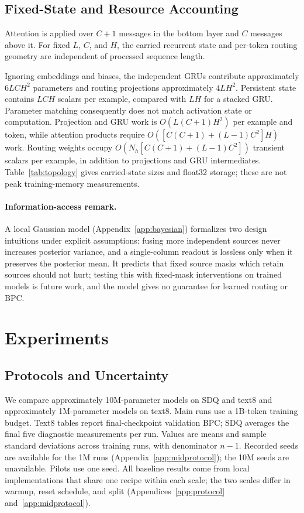 \documentclass[letterpaper,twoside]{article}
\begin{document}
\subsection{Fixed-State and Resource Accounting}

Attention is applied over $C+1$ messages in the bottom layer and $C$ messages above it. For fixed $L$, $C$, and $H$, the carried recurrent state and per-token routing geometry are independent of processed sequence length.

Ignoring embeddings and biases, the independent GRUs contribute approximately $6LCH^2$ parameters and routing projections approximately $4LH^2$. Persistent state contains $LCH$ scalars per example, compared with $LH$ for a stacked GRU. Parameter matching consequently does not match activation state or computation. Projection and GRU work is $O(L(C+1)H^2)$ per example and token, while attention products require $O([C(C+1)+(L-1)C^2]H)$ work. Routing weights occupy $O(N_h[C(C+1)+(L-1)C^2])$ transient scalars per example, in addition to projections and GRU intermediates. Table~\ref{tab:topology} gives carried-state sizes and float32 storage; these are not peak training-memory measurements.

\paragraph{Information-access remark.}
A local Gaussian model (Appendix~\ref{app:bayesian}) formalizes two design intuitions under explicit assumptions: fusing more independent sources never increases posterior variance, and a single-column readout is lossless only when it preserves the posterior mean. It predicts that fixed source masks which retain sources should not hurt; testing this with fixed-mask interventions on trained models is future work, and the model gives no guarantee for learned routing or BPC.

\section{Experiments}\label{sec:experiments}

\subsection{Protocols and Uncertainty}

We compare approximately 10M-parameter models on SDQ and text8 and approximately 1M-parameter models on text8. Main runs use a 1B-token training budget. Text8 tables report final-checkpoint validation BPC; SDQ averages the final five diagnostic measurements per run. Values are means and sample standard deviations across training runs, with denominator $n-1$. Recorded seeds are available for the 1M runs (Appendix~\ref{app:midprotocol}); the 10M seeds are unavailable. Pilots use one seed. All baseline results come from local implementations that share one recipe within each scale; the two scales differ in warmup, reset schedule, and split (Appendices~\ref{app:protocol} and~\ref{app:midprotocol}).
\end{document}
